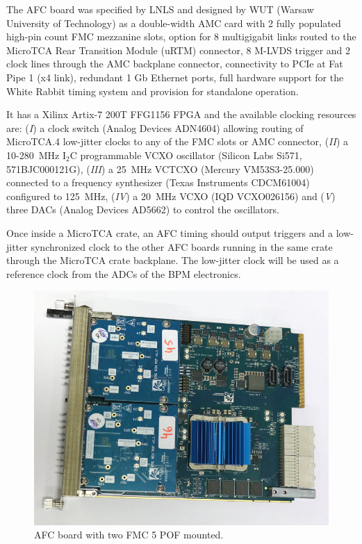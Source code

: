 \documentclass[a4paper,
               biblatex,      %
               ]{jacow}
\begin{document}
The AFC board was specified by LNLS and designed by WUT (Warsaw University of Technology) as a double-width AMC card with 2 fully populated high-pin count FMC mezzanine slots, option for 8 multigigabit links routed to the MicroTCA Rear Transition Module (uRTM) connector, 8 M-LVDS trigger and 2 clock lines through the AMC backplane connector, connectivity to PCIe at Fat Pipe 1 (x4 link), redundant 1 Gb Ethernet ports, full hardware support for the White Rabbit timing system and provision for standalone operation. 


It has a Xilinx Artix-7 200T FFG1156 FPGA and the available clocking resources are: (\textit{I}) a clock switch (Analog Devices ADN4604) allowing routing of MicroTCA.4 low-jitter clocks to any of the FMC slots or AMC connector, (\textit{II}) a 10-280~MHz I$_{2}$C programmable VCXO oscillator (Silicon Labs Si571, 571BJC000121G), (\textit{III}) a 25~MHz VCTCXO (Mercury VM53S3-25.000) connected to a frequency synthesizer (Texas Instruments CDCM61004) configured to 125~MHz, (\textit{IV}) a 20~MHz VCXO (IQD VCXO026156) and (\textit{V}) three DACs (Analog Devices AD5662) to control the oscillators. 

Once inside a MicroTCA crate, an AFC timing should output triggers and a low-jitter synchronized clock to the other AFC boards running in the same crate through the MicroTCA crate backplane. The low-jitter clock will be used as a reference clock from the ADCs of the BPM electronics.

\begin{figure}[!htb]
   \centering
   \includegraphics*[width=0.8\columnwidth]{AFC_POFs_resized}
   \caption{AFC board with two FMC 5 POF mounted.}
   \label{fig:afc_pofs}
\end{figure}
\end{document}
